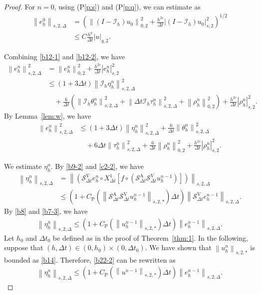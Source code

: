 \documentclass[10pt,a4paper,tbtags,leqno]{amsart}
\theoremstyle{definition}
\numberwithin{equation}{section}
\def\norm#1#2{\left\|#2\right\|_{#1}}
\def\snorm#1#2{\left|#2\right|_{#1}}
\begin{document}
\begin{proof} 
  For $ n = 0 $, using (P\ref{p:s}) and (P\ref{p:q}), we can estimate as 
  \begin{align} 
    \norm{s, 2, \Delta}{e_h^0} & = \left(\norm{0,2}{(I - \mathcal{I}_{h}) u_0}^2 + \frac{h^{2s}}{\Delta t} \snorm{s,2}{(I - \mathcal{I}_{h}) u_0}^2\right)^{1/2} \\ 
    & \leq C \frac{h^q}{\Delta t} \snorm{q, 2}{u}. \label{b25}
  \end{align} 
  
  Combining \eqref{b12-1} and \eqref{b12-2}, we have 
  \begin{align} 
    \norm{s, 2, \Delta}{e_h^n}^2 & = \norm{0, 2}{e_h^n}^2 + \frac{h^{2 s}}{\Delta t} \snorm{s, 2}{e_h^n}^2 \\ & \leq (1 + 3 \Delta t) \norm{s, 2, \Delta}{\mathcal{I}_{h} \eta_h^n}^2 \\ & \quad + \frac{6}{\Delta t} \left(\norm{s, 2, \Delta}{\mathcal{I}_{h} \theta_h^n}^2 + \norm{s, 2, \Delta}{\Delta t \mathcal{I}_{h} \tau_h^n}^2 + \norm{0, 2}{\rho_h^n}^2\right) + \frac{h^{2s}}{\Delta t} \snorm{s, 2}{\rho_h^n}^2. 
  \end{align}
  By Lemma~\ref{lem:w}, we have 
  \begin{align} 
    \norm{s, 2, \Delta}{e_h^n}^2 & \leq (1 + 3 \Delta t) \norm{s, 2, \Delta}{\eta_h^n}^2 + \frac{6}{\Delta t} \norm{s, 2, \Delta}{\theta_h^n}^2 \\ & \quad + 6 \Delta t \norm{s, 2, \Delta}{\tau_h^n}^2 + \frac{6}{\Delta t} \norm{0, 2}{\rho_h^n}^2 + \frac{h^{2s}}{\Delta t} \snorm{s, 2}{\rho_h^n}^2. \label{b24} 
  \end{align}

  We estimate $ \eta_h^n $. 
  By \eqref{b9-2} and \eqref{c2-2}, we have 
  \begin{align}
    \norm{s, 2, \Delta}{\eta_h^n} & = \norm{s, 2, \Delta}{(\mathcal{S}_{\Delta t}^{\mathrm{V}} e_h^n \circ {X_{\Delta t}^1} [f \circ (\mathcal{S}_{\Delta t}^{\mathrm{A}} \mathcal{S}_{\Delta t}^{\mathrm{V}} u_h^{n - 1})])} \\ & \leq \left(1 + C_{\mathrm{P}} (\norm{s, 2, \ast}{\mathcal{S}_{\Delta t}^{\mathrm{A}} \mathcal{S}_{\Delta t}^{\mathrm{V}} u_h^{n - 1}}) \Delta t\right) \norm{s, 2, \Delta}{\mathcal{S}_{\Delta t}^{\mathrm{V}} e_h^{n - 1}}. 
  \end{align}
  By \eqref{b8} and \eqref{b7-3}, we have 
  \begin{align}
    \norm{s, 2, \Delta}{\eta_h^n} \leq \left(1 + C_{\mathrm{P}} (\norm{s, 2, \ast}{u_h^{n - 1}}) \Delta t\right) \norm{s, 2, \Delta}{e_h^{n - 1}}. \label{b22-2}
  \end{align} 
  Let $ h_0 $ and $ \Delta t_0 $ be defined as in the proof of Theorem~\ref{thm:1}. In the following, suppose that $ (h, \Delta t) \in (0, h_0) \times (0, \Delta t_0) $. We have shown that $ \norm{s, 2, \ast}{u_h^n} $ is bounded as \eqref{b14}. Therefore, \eqref{b22-2} can be rewritten as 
  \begin{align} 
    \norm{s, 2, \Delta}{\eta_h^n} \leq \left(1 + C_{\mathrm{P}} (\norm{s, 2, \ast}{u^{n - 1}}) \Delta t\right) \norm{s, 2, \Delta}{e_h^{n - 1}}. \label{b22} 
  \end{align} 


\end{proof}
\end{document}
